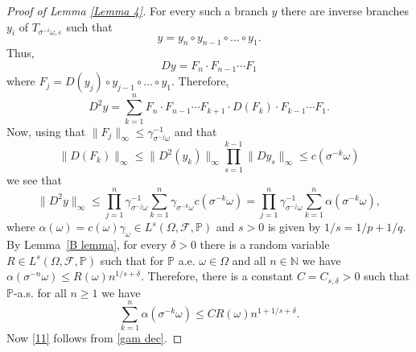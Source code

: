 \documentclass[10pt,a4paper]{amsart}
\def\N{\mathbb{N}}
\def\om{\omega}
\begin{document}
\begin{proof}[Proof of Lemma \ref{Lemma 4}]
  For every such a  branch $y$ there are inverse  branches $y_i$ of $T_{\sigma^{-i}\omega,\varepsilon}$  such that 
  $$
y=y_n\circ y_{n-1}\circ\ldots\circ y_1.
  $$
  Thus, 
  $$
Dy=F_n\cdot F_{n-1}\cdots F_1 
  $$
  where
   $F_j=D(y_j)\circ y_{j-1}\circ\ldots \circ y_1$. Therefore, 
\begin{equation}\label{D2F}
  D^2y=\sum_{k=1}^n F_{n}\cdot F_{n-1}\cdots F_{k+1}\cdot D(F_k)\cdot F_{k-1}\cdots F_1.
\end{equation}
  Now, using that $\|F_j\|_\infty\leq \gamma_{\sigma^{-j}\omega}^{-1}$ and that 
  $$
\|D(F_k)\|_\infty\leq\|D^2(y_k)\|_\infty\prod_{s=1}^{k-1}\|Dy_s\|_\infty\leq
c(\sigma^{-k}\omega)
  $$
  we see that 
  $$
\|D^2y\|_\infty\leq\prod_{j=1}^n\gamma_{\sigma^{-j}\omega}^{-1}\sum_{k=1}^n \gamma_{\sigma^{-k}\omega}c(\sigma^{-k}\omega)=\prod_{j=1}^n\gamma_{\sigma^{-j}\omega}^{-1}\sum_{k=1}^n\alpha(\sigma^{-k}\omega),
  $$
where $\alpha(\omega)=c(\omega)\gamma_\omega\in L^s(\Omega,\mathcal F,\mathbb P)$ and $s>0$ 
is given by $1/s=1/p+1/q$. By Lemma~\ref{B lemma}, for every $\delta>0$ 
there is a random variable $R\in L^s(\Omega,\mathcal F,\mathbb P)$ such that for $\mathbb P$ a.e. $\om \in \Omega$ and all $n\in \N$ we have $\alpha(\sigma^{-n}\omega)\leq R(\omega)n^{1/s+\delta}$. Therefore, there is a constant $C=C_{s,\delta}>0$ such that $\mathbb P$-a.s. for all $n\geq1$ we have
  \begin{equation}\label{above}
\sum_{k=1}^n\alpha(\sigma^{-k}\omega)\leq CR(\omega)n^{1+1/s+\delta}.      
  \end{equation}
Now \eqref{11} follows from \eqref{gam dec}.




\end{proof}
\end{document}
